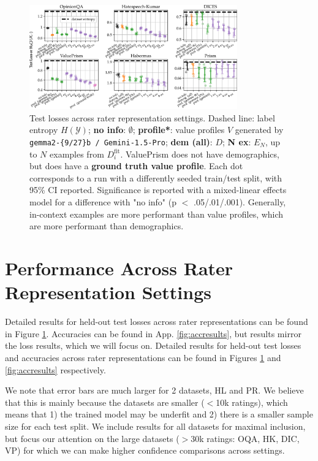 \documentclass[11pt]{article}
\begin{document}
\begin{figure}[t]
\centering
\includegraphics[width=0.8\textwidth]{files/nll-short.pdf}
\small{
\caption{
Test losses across rater representation settings. Dashed line: label entropy $H(\mathcal{Y})$; {\bf no info}: $\emptyset$; \textcolor{profcolor}{\bf profile*}: value profiles $V$ generated by \texttt{gemma2-\{9/27\}b / Gemini-1.5-Pro}; \textcolor{demcolor}{\bf dem (all)}: $D$; \textcolor{excolor}{\bf N ex}: $E_N$, up to $N$ examples from $D_i^\textrm{fit}$. ValuePrism does not have demographics, but does have a \textcolor{gtcolor}{\bf ground truth value profile}. Each dot corresponds to a run with a differently seeded train/test split, with 95\% CI reported. Significance is reported with a mixed-linear effects model for a difference with "no info" (p $<$ .05/.01/.001). Generally, in-context examples are more performant than value profiles, which are more performant than demographics.
}
\label{fig:nllresults}
}
\end{figure}


\section{Performance Across Rater Representation Settings}
\label{sec:results-ratererep}
Detailed results for held-out test losses across rater representations can be found in Figure \ref{fig:nllresults}. Accuracies can be found in App. \ref{fig:accresults}, but results mirror the loss results, which we will focus on.
Detailed results for held-out test losses and accuracies across rater representations can be found in Figures \ref{fig:nllresults} and \ref{fig:accresults} respectively.

We note that error bars are much larger for 2 datasets, HL and PR. We believe that this is mainly because the datasets are smaller ($<$10k ratings), which means that 1) the trained model may be underfit and 2) there is a smaller sample size for each test split. We include results for all datasets for maximal inclusion, but focus our attention on the large datasets ($>$30k ratings: OQA, HK, DIC, VP) for which we can make higher confidence comparisons across settings.
\end{document}
